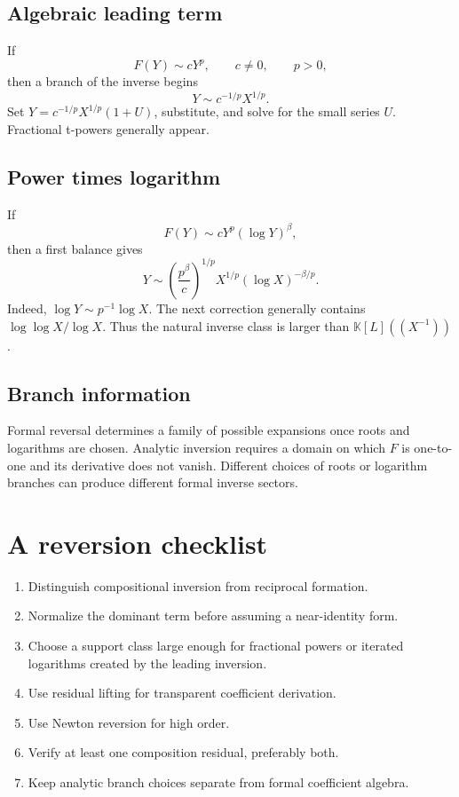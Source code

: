 \documentclass[11pt,openany]{book}
\theoremstyle{definition}
\theoremstyle{plain}
\theoremstyle{remark}
\newcommand{\K}{\mathbb{K}}
\begin{document}
\subsection{Algebraic leading term}
If
\[
 F(Y)\sim cY^p,
 \qquad c\ne0,
 \qquad p>0,
\]
then a branch of the inverse begins
\[
 Y\sim c^{-1/p}X^{1/p}.
\]
Set \(Y=c^{-1/p}X^{1/p}(1+U)\), substitute, and solve for the small series
\(U\).  Fractional t-powers generally appear.

\subsection{Power times logarithm}
If
\begin{equation}\label{eq:power-log-leading}
 F(Y)\sim cY^p(\log Y)^\beta,
\end{equation}
then a first balance gives
\begin{equation}\label{eq:power-log-leading-inverse}
 Y\sim
 \left(\frac{p^\beta}{c}\right)^{1/p}
 X^{1/p}(\log X)^{-\beta/p}.
\end{equation}
Indeed, \(\log Y\sim p^{-1}\log X\).  The next correction generally contains
\(\log\log X/\log X\).  Thus the natural inverse class is larger than
\(\K[L]((X^{-1}))\).

\subsection{Branch information}
Formal reversal determines a family of possible expansions once roots and
logarithms are chosen.  Analytic inversion requires a domain on which \(F\) is
one-to-one and its derivative does not vanish.  Different choices of roots or
logarithm branches can produce different formal inverse sectors.

\section{A reversion checklist}
\begin{enumerate}
\item Distinguish compositional inversion from reciprocal formation.
\item Normalize the dominant term before assuming a near-identity form.
\item Choose a support class large enough for fractional powers or iterated
      logarithms created by the leading inversion.
\item Use residual lifting for transparent coefficient derivation.
\item Use Newton reversion for high order.
\item Verify at least one composition residual, preferably both.
\item Keep analytic branch choices separate from formal coefficient algebra.
\end{enumerate}
\end{document}
